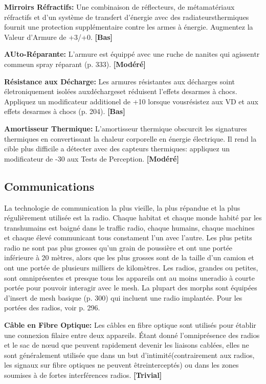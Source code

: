 \textbf{Mirroirs Réfractifs:} Une combinaison de réflecteurs, de métamatériaux réfractifs et d'un système de transfert d'énergie avec des radiateursthermiques fournit une protection supplémentaire contre les armes à énergie. Augmentez la Valeur d'Armure de +3/+0. \textbf{[Bas]} 

\textbf{AUto-Réparante:} L'armure est équippé avec une ruche de nanites qui agissentr commeun spray réparant (p. 333). \textbf{[Modéré]} 

\textbf{Résistance aux Décharge:} Les armures résistantes aux décharges soint életroniquement isolées auxdéchargeset réduisent l'effets desarmes à chocs. Appliquez un modificateur additionel de +10 lorsque vousrésistez aux VD et aux effets desarmes à chocs (p. 204). \textbf{[Bas]} 

\textbf{Amortisseur Thermique:} L'amortisseur thermique obscurcit les signatures thermiques en convertissant la chaleur corporelle en énergie électrique. Il rend la cible plus difficile a détecter avec des capteurs thermiques: appliquez un modificateur de -30 aux Tests de Perception. \textbf{[Modéré]} 

\subsection{Communications} \label{sec:communications} 

La technologie de communication la plus vieille, la plus répandue et la plus régulièrement utilisée est la radio. Chaque habitat et chaque monde habité par les transhumains est baigné dans le traffic radio, chaque humains, chaque machines et chaque élevé communicant tous constament l'un avec l'autre. Les plus petits radio ne sont pas plus grosses qu'un grain de poussière et ont une portée inférieure à 20 mètres, alors que les plus grosses sont de la taille d'un camion et ont une portée de plusieurs milliers de kilomètres. Les radios, grandes ou petites, sont omniprésentes et presque tous les appareils ont au moins uneradio à courte portée pour pouvoir interagir avec le mesh. La plupart des morphs sont équipées d'insert de mesh basique (p. 300) qui incluent une radio implantée. Pour les portées des radios, voir p. 296. 

\textbf{Câble en Fibre Optique:} Les câbles en fibre optique sont utilisés pour établir une connexion filaire entre deux appareils. Étant donné l'omniprésence des radios et le sac de nœud que peuvent rapidement devenir les liaisons cablées, elles ne sont généralement utilisée que dans un but d'intimité(contrairement aux radios, les signaux sur fibre optiques ne peuvent êtreinterceptés) ou dans les zones soumises à de fortes interférences radios. \textbf{[Trivial]} 

